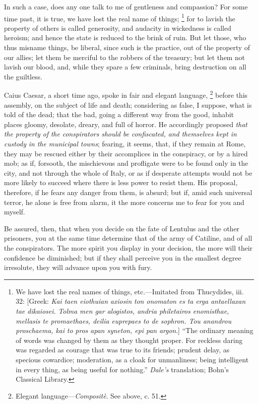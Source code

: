 In such a case, does any one talk to me of gentleness and compassion?
For some time past, it is true, we have lost the real name of things;
\footnote{We have lost the real names of things, etc.—Imitated from
Thucydides, iii. 32: [Greek: \emph{Kai taen eiothuian axiosin ton onomaton
es ta erga antaellaxan tae dikaiosei. Tolma men gar alogistos, andria
philetairos enomisthae, mellasis te promaethaes, deilia euprepaes to
de sophron. Tou anandrou proschaema, kai to pros apan syneton, epi pan
argon}.] ``The ordinary meaning of words was changed by them as they
thought proper. For reckless daring was regarded as courage that was
true to its friends; prudent delay, as specious cowardice; moderation,
as a cloak for unmanliness; being intelligent in every thing, as being
useful for nothing.'' \emph{Dale's} translation; Bohn's Classical Library.} for to lavish the property of others is called generosity, and
audacity in wickedness is called heroism; and hence the state is reduced
to the brink of ruin. But let those, who thus misname things, be liberal,
since such is the practice, out of the property of our allies; let them
be merciful to the robbers of the treasury; but let them not lavish our
blood, and, while they spare a few criminals, bring destruction on all
the guiltless.

Caius Caesar, a short time ago, spoke in fair and elegant language,
\footnote{Elegant language—\emph{Compositè}. See above, c. 51.} before this assembly, on the subject of life and death; considering
as false, I suppose, what is told of the dead; that the bad, going a
different way from the good, inhabit places gloomy, desolate, dreary, and
full of horror. He accordingly proposed \emph{that the property of the
conspirators should be confiscated, and themselves kept in custody in
the municipal towns}; fearing, it seems, that, if they remain at Rome,
they may be rescued either by their accomplices in the conspiracy, or by
a hired mob; as if, forsooth, the mischievous and profligate were to be
found only in the city, and not through the whole of Italy, or as if
desperate attempts would not be more likely to succeed where there is
less power to resist them. His proposal, therefore, if he fears any
danger from them, is absurd; but if, amid such universal terror, he
alone is free from alarm, it the more concerns me to fear for you and
myself.

Be assured, then, that when you decide on the fate of Lentulus and
the other prisoners, you at the same time determine that of the army
of Catiline, and of all the conspirators. The more spirit you display
in your decision, the more will their confidence be diminished; but if
they shall perceive you in the smallest degree irresolute, they will
advance upon you with fury.

